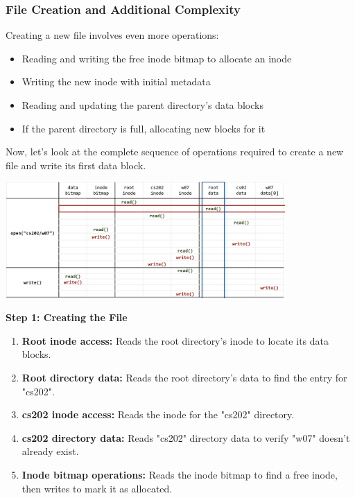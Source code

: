 \documentclass[../../compsys.tex]{subfiles}
\begin{document}
\subsubsection{File Creation and Additional Complexity}
Creating a new file involves even more operations:
\begin{itemize}
    \item Reading and writing the free inode bitmap to allocate an inode
    \item Writing the new inode with initial metadata
    \item Reading and updating the parent directory's data blocks
    \item If the parent directory is full, allocating new blocks for it
\end{itemize}
\newpage
\begin{example}
\leavevmode
\upshape
Now, let's look at the complete sequence of operations required to create a new file and write its first data block.

\begin{center}
  \includegraphics[width=0.8\textwidth]{chapters/L7/images/write.png}
\end{center}
\textbf{Step 1: Creating the File}
\begin{enumerate}
    \item \textbf{Root inode access:} Reads the root directory's inode to locate its data blocks.
    
    \item \textbf{Root directory data:} Reads the root directory's data to find the entry for "cs202".
    
    \item \textbf{cs202 inode access:} Reads the inode for the "cs202" directory.
    
    \item \textbf{cs202 directory data:} Reads "cs202" directory data to verify "w07" doesn't already exist.
    
    \item \textbf{Inode bitmap operations:} Reads the inode bitmap to find a free inode, then writes to mark it as allocated.
    

\end{enumerate}
\end{example}
\end{document}
